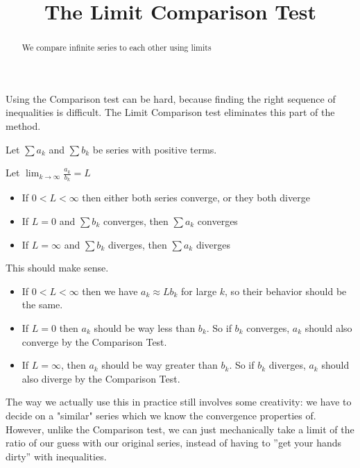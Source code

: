 \documentclass{ximera}
\title[Dig-In:]{The Limit Comparison Test}
\begin{document}
\begin{abstract}
We compare infinite series to each other using limits
\end{abstract}
\maketitle

Using the Comparison test can be hard, because finding the right sequence of inequalities is difficult.  The Limit Comparison test eliminates this part of the method.

\begin{theorem}
	Let $\sum a_k$ and $\sum b_k$ be series with positive terms.
	
	Let $\lim_{k \to \infty} \frac{a_k}{b_k} = L$ 
	
	\begin{itemize}
		\item If $0<L<\infty$ then either both series converge, or they both diverge
		\item If $L=0$ and $\sum b_k$ converges, then $\sum a_k$ converges
		\item If $L=\infty$ and $\sum b_k$ diverges, then $\sum a_k$ diverges
	\end{itemize}
\end{theorem}

This should make sense.

	\begin{itemize}
		\item If $0<L<\infty$ then we have $a_k \approx Lb_k$ for large $k$, so their behavior should be the same.
		\item If $L=0$ then $a_k$ should be way less than $b_k$.  So if $b_k$ converges, $a_k$ should also converge by the Comparison Test.
		\item If $L=\infty$, then  $a_k$ should be way greater than $b_k$. So if  $b_k$ diverges, $a_k$ should also diverge by the Comparison Test.
	\end{itemize}


The way we actually use this in practice still involves some creativity:  we have to decide on a "similar" series which we know the convergence properties of.  However, unlike the Comparison test, we can just mechanically take a limit of the ratio of our guess with our original series, instead of having to ''get your hands dirty'' with inequalities.
\end{document}
